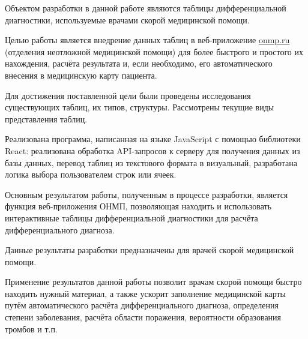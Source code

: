 \abstract %


Объектом разработки в данной работе являются таблицы дифференциальной диагностики, используемые врачами скорой медицинской помощи. 

Целью работы является внедрение данных таблиц в веб-приложение \url{onmp.ru} (отделения неотложной медицинской помощи) для более быстрого и простого их нахождения, расчёта результата и, если необходимо, его автоматического внесения в медицинскую карту пациента.

Для достижения поставленной цели были проведены исследования существующих таблиц, их типов, структуры. Рассмотрены текущие виды представления таблиц. 

Реализована программа, написанная на языке JavaScript с помощью библиотеки React: реализована обработка API-запросов к серверу для получения данных из базы данных, перевод таблиц из текстового формата в визуальный, разработана логика выбора пользователем строк или ячеек.

Основным результатом работы, полученным в процессе разработки, является функция веб-приложения ОНМП, позволяющая находить и использовать интерактивные таблицы дифференциальной диагностики для расчёта дифференциального диагноза. 

Данные результаты разработки предназначены для врачей скорой медицинской помощи.

Применение результатов данной работы позволит врачам скорой помощи быстро находить нужный материал, а также ускорит заполнение медицинской карты путём автоматического расчёта дифференциального диагноза, определения степени заболевания, расчёта области поражения, вероятности образования тромбов и т.п.